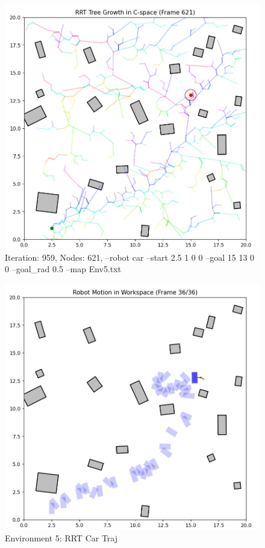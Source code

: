 \documentclass{article}
\begin{document}
\begin{figure} [H]
    \centering
    \includegraphics[width=0.5\linewidth]{latex_media/Env5Car_rrt_grow.jpg}
    \caption{Iteration: 959, Nodes: 621, --robot car --start 2.5 1 0 0 --goal 15 13 0 0 --goal\_rad 0.5 --map Env5.txt}
\end{figure}

\begin{figure} [H]
    \centering
    \includegraphics[width=0.5\linewidth]{latex_media/Env5Car_rrt_traj.jpg}
    \caption{Environment 5: RRT Car Traj}
\end{figure}
\end{document}
